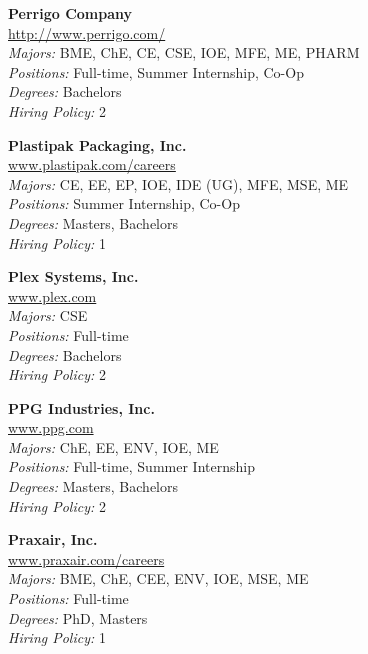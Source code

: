 \documentclass[twoside]{article}
\begin{document}
\begin{center}
\begin{multicols}{3}
\begin{minipage}{.9\columnwidth}{\Large\bf Perrigo Company }\\
	\url{http://www.perrigo.com/}\\
	\emph{Majors:} BME, ChE, CE, CSE, IOE, MFE, ME, PHARM\\
	\emph{Positions:} Full-time, Summer Internship, Co-Op\\
	\emph{Degrees:} Bachelors\\
	\emph{Hiring Policy:} 2\\
\end{minipage}
 
\begin{minipage}{.9\columnwidth}{\Large\bf Plastipak Packaging, Inc. }\\
	\url{www.plastipak.com/careers}\\
	\emph{Majors:} CE, EE, EP, IOE, IDE (UG), MFE, MSE, ME\\
	\emph{Positions:} Summer Internship, Co-Op\\
	\emph{Degrees:} Masters, Bachelors\\
	\emph{Hiring Policy:} 1\\
\end{minipage}
 
\begin{minipage}{.9\columnwidth}{\Large\bf Plex Systems, Inc. }\\
	\url{www.plex.com}\\
	\emph{Majors:} CSE\\
	\emph{Positions:} Full-time\\
	\emph{Degrees:} Bachelors\\
	\emph{Hiring Policy:} 2\\
\end{minipage}
 
\begin{minipage}{.9\columnwidth}{\Large\bf PPG Industries, Inc. }\\
	\url{www.ppg.com}\\
	\emph{Majors:} ChE, EE, ENV, IOE, ME\\
	\emph{Positions:} Full-time, Summer Internship\\
	\emph{Degrees:} Masters, Bachelors\\
	\emph{Hiring Policy:} 2\\
\end{minipage}
 
\begin{minipage}{.9\columnwidth}{\Large\bf Praxair, Inc. }\\
	\url{www.praxair.com/careers}\\
	\emph{Majors:} BME, ChE, CEE, ENV, IOE, MSE, ME\\
	\emph{Positions:} Full-time\\
	\emph{Degrees:} PhD, Masters\\
	\emph{Hiring Policy:} 1\\
\end{minipage}
 

\end{multicols}
\end{center}
\end{document}
